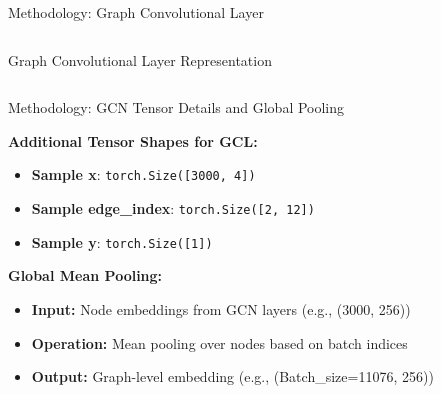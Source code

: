 \begin{frame}{Methodology: Graph Convolutional Layer}
\begin{columns}[c]
        \vspace{0.3cm}
        \small{\textcolor{uwopurple}{Graph Convolutional Layer Representation}}

    \end{columns}
\end{frame}


\begin{frame}{Methodology: GCN Tensor Details and Global Pooling}
    \centering %

    \textbf{Additional Tensor Shapes for GCL:}
    \vspace{5pt} %
    \begin{itemize}
        \item \textbf{Sample x}: \texttt{torch.Size([3000, 4])}
        \item \textbf{Sample edge\_index}: \texttt{torch.Size([2, 12])}
        \item \textbf{Sample y}: \texttt{torch.Size([1])}
    \end{itemize}

    \vspace{10pt} %
    \textbf{Global Mean Pooling:}
    \vspace{5pt}
    \begin{itemize}
        \item \textbf{Input:} Node embeddings from GCN layers (e.g., (3000, 256))
        \item \textbf{Operation:} Mean pooling over nodes based on batch indices
        \item \textbf{Output:} Graph-level embedding (e.g., (Batch\_size=11076, 256))
    \end{itemize}

\end{frame}




